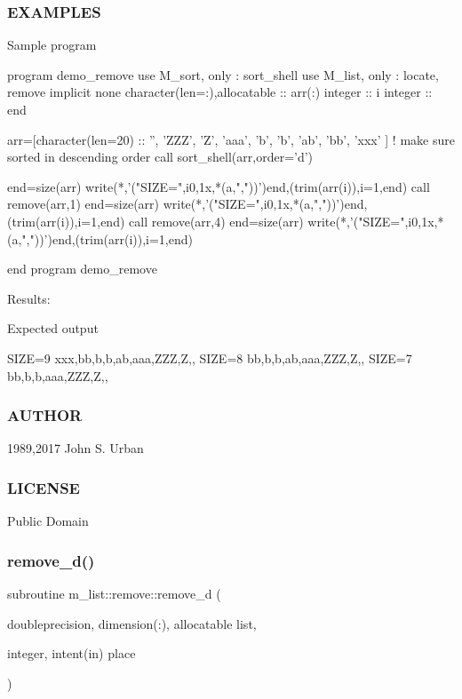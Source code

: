 \subsubsection*{E\+X\+A\+M\+P\+L\+ES}

\begin{DoxyVerb}Sample program

 program demo_remove
 use M_sort, only : sort_shell
 use M_list, only : locate, remove
 implicit none
 character(len=:),allocatable :: arr(:)
 integer                       :: i
 integer                       :: end

 arr=[character(len=20) :: '', 'ZZZ', 'Z', 'aaa', 'b', 'b', 'ab', 'bb', 'xxx' ]
 ! make sure sorted in descending order
 call sort_shell(arr,order='d')

 end=size(arr)
 write(*,'("SIZE=",i0,1x,*(a,","))')end,(trim(arr(i)),i=1,end)
 call remove(arr,1)
 end=size(arr)
 write(*,'("SIZE=",i0,1x,*(a,","))')end,(trim(arr(i)),i=1,end)
 call remove(arr,4)
 end=size(arr)
 write(*,'("SIZE=",i0,1x,*(a,","))')end,(trim(arr(i)),i=1,end)

 end program demo_remove
\end{DoxyVerb}


Results\+:

Expected output

S\+I\+ZE=9 xxx,bb,b,b,ab,aaa,Z\+ZZ,Z,, S\+I\+ZE=8 bb,b,b,ab,aaa,Z\+ZZ,Z,, S\+I\+ZE=7 bb,b,b,aaa,Z\+ZZ,Z,,

\subsubsection*{A\+U\+T\+H\+OR}

1989,2017 John S. Urban \subsubsection*{L\+I\+C\+E\+N\+SE}

Public Domain \mbox{\label{interfacem__list_1_1remove_ad82ff90a5f60f1ffb4eb9b29653886da}} 
\subsubsection{\texorpdfstring{remove\+\_\+d()}{remove\_d()}}
{\footnotesize\ttfamily subroutine m\+\_\+list\+::remove\+::remove\+\_\+d (\begin{DoxyParamCaption}\item[{doubleprecision, dimension(\+:), allocatable}]{list,  }\item[{integer, intent(in)}]{place }\end{DoxyParamCaption})\hspace{0.3cm}{\ttfamily [private]}}

